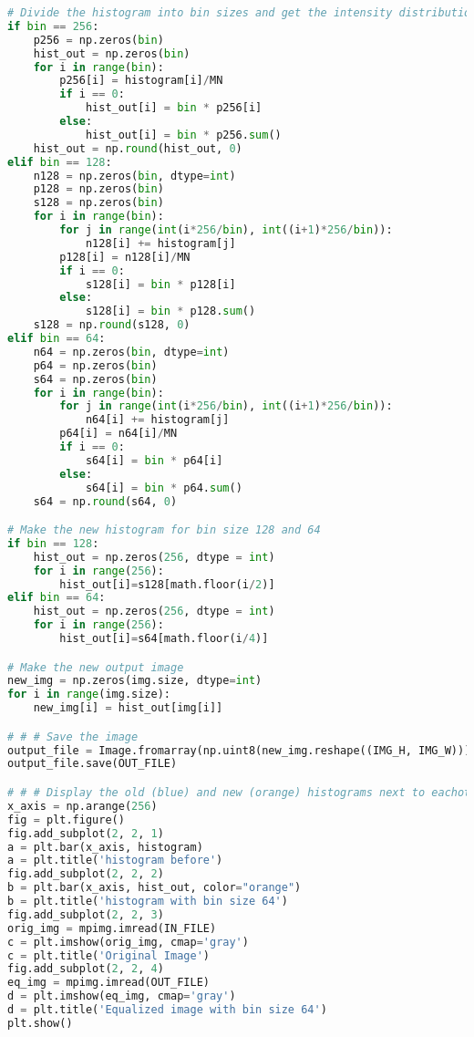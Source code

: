 \documentclass[12pt, letterpaper]{article}
\begin{document}
\begin{enumerate}
\begin{enumerate}
\begin{lstlisting}[language=Python]
# Divide the histogram into bin sizes and get the intensity distribution and transformation function.
if bin == 256:
    p256 = np.zeros(bin)
    hist_out = np.zeros(bin)
    for i in range(bin):
        p256[i] = histogram[i]/MN
        if i == 0:
            hist_out[i] = bin * p256[i]
        else:
            hist_out[i] = bin * p256.sum()
    hist_out = np.round(hist_out, 0)
elif bin == 128:
    n128 = np.zeros(bin, dtype=int)
    p128 = np.zeros(bin)
    s128 = np.zeros(bin)
    for i in range(bin):
        for j in range(int(i*256/bin), int((i+1)*256/bin)):
            n128[i] += histogram[j]
        p128[i] = n128[i]/MN
        if i == 0:
            s128[i] = bin * p128[i]
        else:
            s128[i] = bin * p128.sum()
    s128 = np.round(s128, 0)
elif bin == 64:
    n64 = np.zeros(bin, dtype=int)
    p64 = np.zeros(bin)
    s64 = np.zeros(bin)
    for i in range(bin):
        for j in range(int(i*256/bin), int((i+1)*256/bin)):
            n64[i] += histogram[j]
        p64[i] = n64[i]/MN
        if i == 0:
            s64[i] = bin * p64[i]
        else:
            s64[i] = bin * p64.sum()
    s64 = np.round(s64, 0)

# Make the new histogram for bin size 128 and 64
if bin == 128:
    hist_out = np.zeros(256, dtype = int)
    for i in range(256):
        hist_out[i]=s128[math.floor(i/2)]
elif bin == 64:
    hist_out = np.zeros(256, dtype = int)
    for i in range(256):
        hist_out[i]=s64[math.floor(i/4)]

# Make the new output image
new_img = np.zeros(img.size, dtype=int)
for i in range(img.size):
    new_img[i] = hist_out[img[i]]

# # # Save the image
output_file = Image.fromarray(np.uint8(new_img.reshape((IMG_H, IMG_W))))
output_file.save(OUT_FILE)

# # # Display the old (blue) and new (orange) histograms next to eachother
x_axis = np.arange(256)
fig = plt.figure()
fig.add_subplot(2, 2, 1)
a = plt.bar(x_axis, histogram)
a = plt.title('histogram before')
fig.add_subplot(2, 2, 2)
b = plt.bar(x_axis, hist_out, color="orange")
b = plt.title('histogram with bin size 64')
fig.add_subplot(2, 2, 3)
orig_img = mpimg.imread(IN_FILE)
c = plt.imshow(orig_img, cmap='gray')
c = plt.title('Original Image')
fig.add_subplot(2, 2, 4)
eq_img = mpimg.imread(OUT_FILE)
d = plt.imshow(eq_img, cmap='gray')
d = plt.title('Equalized image with bin size 64')
plt.show()
	

\end{lstlisting}
\end{enumerate}
\end{enumerate}
\end{document}
